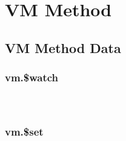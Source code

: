 \begin{lstlisting}[language=JavaScript]

\end{lstlisting}




\begin{lstlisting}[language=JavaScript]

\end{lstlisting}




\begin{lstlisting}[language=JavaScript]

\end{lstlisting}




\chapter{VM Method}


\section{VM Method Data}


\subsection{vm.\$watch}









\begin{lstlisting}[language=JavaScript]

\end{lstlisting}




\begin{lstlisting}[language=JavaScript]

\end{lstlisting}




\begin{lstlisting}[language=JavaScript]

\end{lstlisting}


\subsection{vm.\$set}








